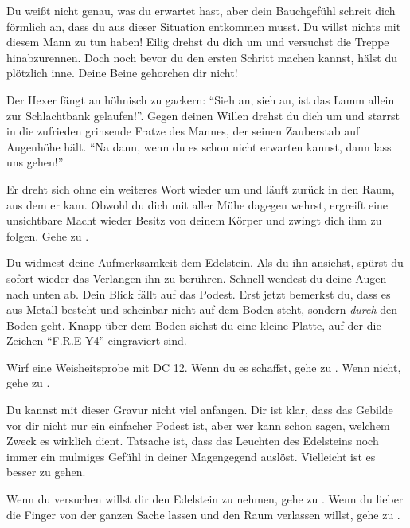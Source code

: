 
Du weißt nicht genau, was du erwartet hast, aber dein Bauchgefühl schreit dich förmlich an, dass du aus dieser Situation entkommen musst. Du willst nichts mit diesem Mann zu tun haben! Eilig drehst du dich um und versuchst die Treppe hinabzurennen. Doch noch bevor du den ersten Schritt machen kannst, hälst du plötzlich inne. Deine Beine gehorchen dir nicht!

Der Hexer fängt an höhnisch zu gackern: ``Sieh an, sieh an, ist das Lamm allein zur Schlachtbank gelaufen!''. Gegen deinen Willen drehst du dich um und starrst in die zufrieden grinsende Fratze des Mannes, der seinen Zauberstab auf Augenhöhe hält. ``Na dann, wenn du es schon nicht erwarten kannst, dann lass uns gehen!''

Er dreht sich ohne ein weiteres Wort wieder um und läuft zurück in den Raum, aus dem er kam. Obwohl du dich mit aller Mühe dagegen wehrst, ergreift eine unsichtbare Macht wieder Besitz von deinem Körper und zwingt dich ihm zu folgen.
Gehe zu .


Du widmest deine Aufmerksamkeit dem Edelstein. Als du ihn ansiehst, spürst du sofort wieder das Verlangen ihn zu berühren. Schnell wendest du deine Augen nach unten ab. Dein Blick fällt auf das Podest. Erst jetzt bemerkst du, dass es aus Metall besteht und scheinbar nicht auf dem Boden steht, sondern \textit{durch} den Boden geht. Knapp über dem Boden siehst du eine kleine Platte, auf der die Zeichen ``F.R.E-Y4'' eingraviert sind.

Wirf eine Weisheitsprobe mit DC 12. Wenn du es schaffst, gehe zu .
Wenn nicht, gehe zu .


Du kannst mit dieser Gravur nicht viel anfangen. Dir ist klar, dass das Gebilde vor dir nicht nur ein einfacher Podest ist, aber wer kann schon sagen, welchem Zweck es wirklich dient. Tatsache ist, dass das Leuchten des Edelsteins noch immer ein mulmiges Gefühl in deiner Magengegend auslöst. Vielleicht ist es besser zu gehen.

Wenn du versuchen willst dir den Edelstein zu nehmen, gehe zu .
Wenn du lieber die Finger von der ganzen Sache lassen und den Raum verlassen willst, gehe zu .

